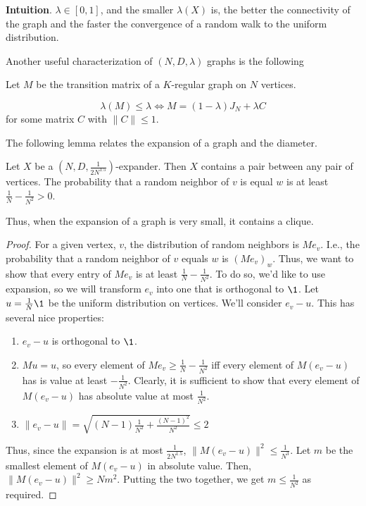 \documentclass{article}
\begin{document}
\textbf{Intuition}. $\lambda \in [0,1]$, and the smaller $\lambda(X)$ is, the better the connectivity of the graph and the faster the convergence of a random walk to the uniform distribution.

Another useful characterization of $(N, D, \lambda)$ graphs is the following
\begin{lemma}\label{lem:expander-characterization}
    Let $M$ be the transition matrix of a $K$-regular graph on $N$ vertices. 

    $$
\lambda(M) \leq \lambda \iff M = (1 - \lambda)J_N + \lambda C
    $$
    for some matrix $C$ with $\|C\| \leq 1$.
\end{lemma}

The following lemma relates the expansion of a graph and the diameter.

\begin{lemma} \label{lem:high-expansion}
    Let $X$ be a $(N, D, \frac{1}{2N^{1.5}})$-expander. Then $X$ contains a pair between any pair of vertices. The probability that a random neighbor of $v$ is equal $w$ is at least $\frac{1}{N} - \frac{1}{N^2} > 0$.
\end{lemma}

Thus, when the expansion of a graph is very small, it contains a clique.

\begin{proof}
    For a given vertex, $v$, the distribution of random neighbors is $Me_v$. I.e., the probability that a random neighbor of $v$ equals $w$ is $(Me_v)_w$. Thus, we want to show that every entry of $Me_v$ is at least $\frac{1}{N} - \frac{1}{N^2}$. To do so, we'd like to use expansion, so we will transform $e_v$ into one that is orthogonal to $\1$. Let $u = \frac{1}{N}\1$ be the uniform distribution on vertices. We'll consider $e_v - u$. This has several nice properties:
    \begin{enumerate}
        \item $e_v - u$ is orthogonal to $\1$.
        \item $Mu = u$, so every element of $Me_v \geq \frac{1}{N} - \frac{1}{N^2}$ iff every element of $M(e_v - u)$ has is value at least $-\frac{1}{N^2}$. Clearly, it is sufficient to show that every element of $M(e_v - u)$ has absolute value at most $\frac{1}{N^2}$.
        \item $\|e_v - u\| = \sqrt{(N-1)\frac{1}{N^2} + \frac{(N-1)^2}{N^2}} \leq 2$
    \end{enumerate}
    Thus, since the expansion is at most $\frac{1}{2N^{1.5}}$, $\|M(e_v - u)\|^2 \leq \frac{1}{N^3}$. Let $m$ be the smallest element of $M(e_v - u)$ in absolute value. Then, $\|M(e_v - u)\|^2 \geq Nm^2$. Putting the two together, we get $m \leq \frac{1}{N^2}$ as required.
    
\end{proof}
\end{document}
